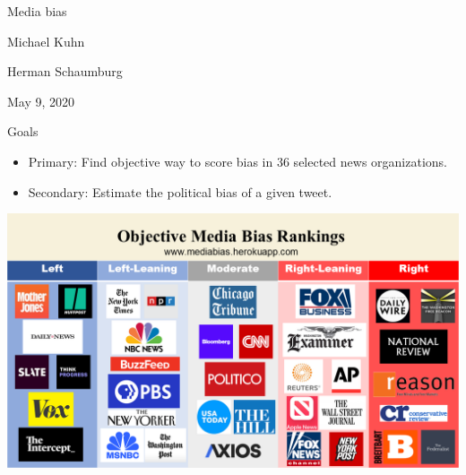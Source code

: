 \documentclass[12pt]{article}
\theoremstyle{example}
\theoremstyle{defn}
\begin{document}
\pagestyle{fancy}
\setlength{\parindent}{0pt}
\setlength{\parskip}{12pt}
\setlength{\columnsep}{0.4in}
\thispagestyle{empty} %
\pagecolor{background}
\setcounter{page}{0}

\vspace*{\fill}




\setcounter{section}{14}
\setcounter{subsection}{3}

\setcounter{example}{0}

\vspace*{\fill}

\begin{center}
\begin{spacing}{1.5}
\begin{Large}
Media bias
\end{Large}
\end{spacing}


\vspace*{12pt}
{Michael Kuhn

Herman Schaumburg

May 9, 2020}


\end{center}

\vspace*{\fill}

\clearpage


{Goals}

\vspace*{-16pt}
\begin{footnotesize}
\begin{itemize}[\label{}]
\item Primary: Find objective way to score bias in 36 selected news organizations.
\item Secondary: Estimate the political bias of a given tweet.
\end{itemize}
\end{footnotesize}

\clearpage

\vfill

\hspace*{\fill}
\includegraphics[scale=0.3]{mediabiaschart.png}
\hspace*{\fill}
\end{document}
